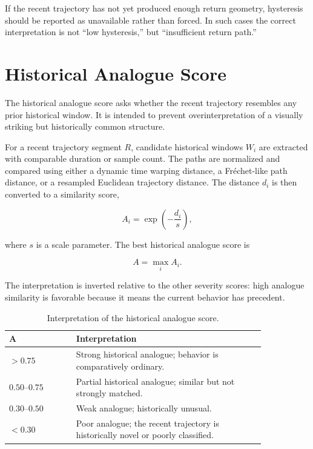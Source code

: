 \documentclass[11pt]{article}
\begin{document}
If the recent trajectory has not yet produced enough return geometry, hysteresis should be reported as unavailable rather than forced. In such cases the correct interpretation is not ``low hysteresis,'' but ``insufficient return path.''

\section{Historical Analogue Score}

The historical analogue score asks whether the recent trajectory resembles any prior historical window. It is intended to prevent overinterpretation of a visually striking but historically common structure.

For a recent trajectory segment \(R\), candidate historical windows \(W_i\) are extracted with comparable duration or sample count. The paths are normalized and compared using either a dynamic time warping distance, a Fréchet-like path distance, or a resampled Euclidean trajectory distance. The distance \(d_i\) is then converted to a similarity score,

\begin{equation}
A_i = \exp\left(-\frac{d_i}{s}\right),
\end{equation}

where \(s\) is a scale parameter. The best historical analogue score is

\begin{equation}
A = \max_i A_i.
\end{equation}

The interpretation is inverted relative to the other severity scores: high analogue similarity is favorable because it means the current behavior has precedent.

\begin{table}[H]
\centering
\caption{Interpretation of the historical analogue score.}
\begin{tabular}{>{\raggedleft\arraybackslash}p{0.22\linewidth} p{0.62\linewidth}}
\toprule
\(\boldsymbol{A}\) & Interpretation \\
\midrule
\(>0.75\) & Strong historical analogue; behavior is comparatively ordinary. \\
\(0.50\)--\(0.75\) & Partial historical analogue; similar but not strongly matched. \\
\(0.30\)--\(0.50\) & Weak analogue; historically unusual. \\
\(<0.30\) & Poor analogue; the recent trajectory is historically novel or poorly classified. \\
\bottomrule
\end{tabular}
\end{table}
\end{document}
